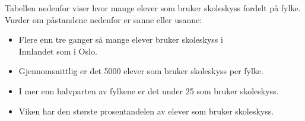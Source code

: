 Tabellen nedenfor viser hvor mange elever som bruker skoleskyss fordelt på fylke. \vs
{}
Vurder om påstandene nedenfor er sanne eller usanne:
\begin{itemize}
	\item Flere enn tre ganger så mange elever bruker
	skoleskyss i \\ Innlandet som i Oslo.
	\item Gjennomsnittlig er det 5000 elever som bruker
	skoleskyss per fylke.
	\item I mer enn halvparten av fylkene er det under 25 %
	som bruker skoleskyss.
	\item Viken har den største prosentandelen av elever som bruker skoleskyss.
\end{itemize}


